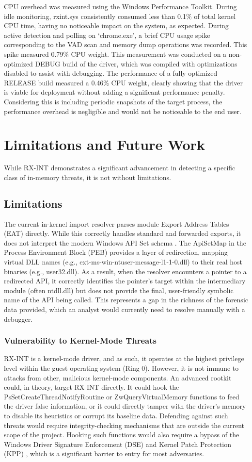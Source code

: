 \documentclass[journal]{IEEEtran}
\begin{document}
CPU overhead was measured using the Windows Performance Toolkit. During idle monitoring, rxint.sys consistently consumed less than 0.1\% of total kernel CPU time, having no noticeable impact on the system, as expected. During active detection and polling on `chrome.exe', a brief CPU usage spike corresponding to the VAD scan and memory dump operations was recorded. This spike measured 0.79\% CPU weight. This measurement was conducted on a non-optimized DEBUG build of the driver, which was compiled with optimizations disabled to assist with debugging. The performance of a fully optimized RELEASE build measured a 0.46\% CPU weight, clearly showing that the driver is viable for deployment without adding a significant performance penalty. Considering this is including periodic snapshots of the target process, the performance overhead is negligible and would not be noticeable to the end user.

\section{Limitations and Future Work}
\label{sec:limitations}
While RX-INT demonstrates a significant advancement in detecting a specific class of in-memory threats, it is not without limitations.
\subsection{Limitations}
The current in-kernel import resolver parses module Export Address Tables (EAT) directly. While this correctly handles standard and forwarded exports, it does not interpret the modern Windows API Set schema \cite{MSDN_APISets}. The ApiSetMap in the Process Environment Block (PEB) provides a layer of redirection, mapping virtual DLL names (e.g., ext-ms-win-ntuser-message-l1-1-0.dll) to their real host binaries (e.g., user32.dll). As a result, when the resolver encounters a pointer to a redirected API, it correctly identifies the pointer's target within the intermediary module (often ntdll.dll) but does not provide the final, user-friendly symbolic name of the API being called. This represents a gap in the richness of the forensic data provided, which an analyst would currently need to resolve manually with a debugger.
\subsubsection{Vulnerability to Kernel-Mode Threats}
RX-INT is a kernel-mode driver, and as such, it operates at the highest privilege level within the guest operating system (Ring 0). However, it is not immune to attacks from other, malicious kernel-mode components. An advanced rootkit could, in theory, target RX-INT directly. It could hook the PsSetCreateThreadNotifyRoutine or ZwQueryVirtualMemory functions to feed the driver false information, or it could directly tamper with the driver's memory to disable its heuristics or corrupt its baseline data. Defending against such threats would require integrity-checking mechanisms that are outside the current scope of the project. Hooking such functions would also require a bypass of the Windows Driver Signature Enforcement (DSE) and Kernel Patch Protection (KPP) \cite{microsoftDSE}, which is a significant barrier to entry for most adversaries.
\end{document}
